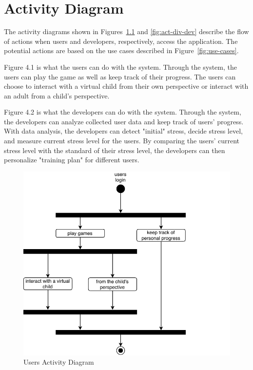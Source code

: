 \chapter{Activity Diagram} %

The activity diagrams shown in Figures~\ref{fig:act-div-usr} and \ref{fig:act-div-dev} describe the flow of actions when users and developers, respectively, access the application. The potential actions are based on the use cases described in Figure~\ref{fig:use-cases}.

Figure 4.1 is what the users can do with the system.
Through the system, the users can play the game as well as keep track of their progress. The users can choose to interact with a virtual child from their own perspective or interact with an adult from a child's perspective. 


Figure 4.2 is what the developers can do with the system.
Through the system, the developers can analyze collected user data and keep track of users' progress. With data analysis, the developers can detect "initial" stress, decide stress level, and measure current stress level for the users. By comparing the users' current stress level with the standard of their stress level, the developers can then personalize "training plan" for different users. 


\begin{figure}[!ht]
    \centering
    \includegraphics[width=0.75\linewidth]{activity-diagram-users}
    \caption{Users Activity Diagram}
    \label{fig:act-div-usr}
\end{figure}

